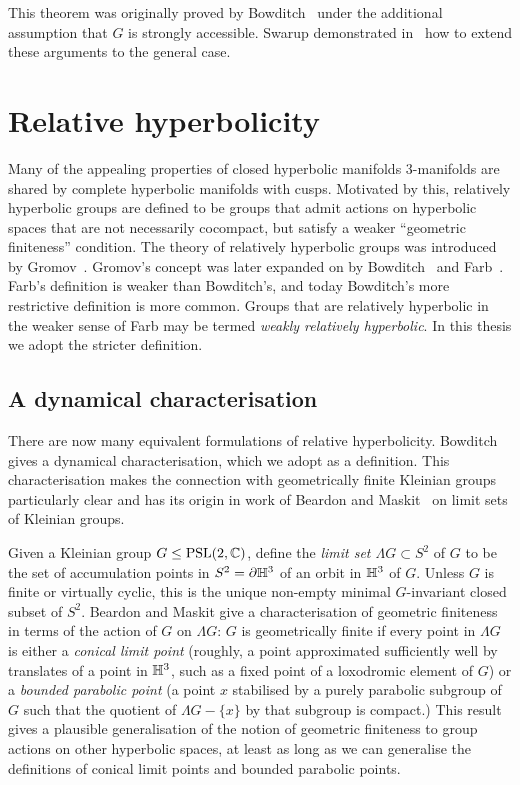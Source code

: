 This theorem was originally proved by Bowditch~\cite{bowditch98b} under the additional assumption that $G$ is strongly accessible.
Swarup demonstrated in~\cite{swarup96} how to extend these arguments to the general case.

\section{Relative hyperbolicity}

Many of the appealing properties of closed hyperbolic manifolds 3-manifolds are shared by complete hyperbolic manifolds with cusps.
Motivated by this, relatively hyperbolic groups are defined to be groups that admit actions on hyperbolic spaces that are not necessarily cocompact, but satisfy a weaker ``geometric finiteness'' condition.
The theory of relatively hyperbolic groups was introduced by Gromov~\cite{gromov87}.
Gromov's concept was later expanded on by Bowditch~\cite{bowditch12} and Farb~\cite{farb98}.
Farb's definition is weaker than Bowditch's, and today Bowditch's more restrictive definition is more common.
Groups that are relatively hyperbolic in the weaker sense of Farb may be termed \emph{weakly relatively hyperbolic}.
In this thesis we adopt the stricter definition.

\subsection{A dynamical characterisation}\label{section:dynamical_characterisation}

There are now many equivalent formulations of relative hyperbolicity.
Bowditch~\cite{bowditch98b} gives a dynamical characterisation, which we adopt as a definition.
This characterisation makes the connection with geometrically finite Kleinian groups particularly clear and has its origin in work of Beardon and Maskit~\cite{beardonmaskit74} on limit sets of Kleinian groups.

Given a Kleinian group $G \leq \mathrm{PSL}(2, \mathbb{C})$, define the \emph{limit set $\Lambda G \subset S^2$} of $G$ to be the set of accumulation points in $S^2 = \partial \mathbb{H}^3$ of an orbit in $\mathbb{H}^3$ of $G$.
Unless $G$ is finite or virtually cyclic, this is the unique non-empty minimal $G$-invariant closed subset of $S^2$.
Beardon and Maskit give a characterisation of geometric finiteness in terms of the action of $G$ on $\Lambda G$: $G$ is geometrically finite if every point in $\Lambda G$ is either a \emph{conical limit point} (roughly, a point approximated sufficiently well by translates of a point in $\mathbb{H}^3$, such as a fixed point of a loxodromic element of $G$) or a \emph{bounded parabolic point} (a point $x$ stabilised by a purely parabolic subgroup of $G$ such that the quotient of $\Lambda G - \{x\}$ by that subgroup is compact.)
This result gives a plausible generalisation of the notion of geometric finiteness to group actions on other hyperbolic spaces, at least as long as we can generalise the definitions of conical limit points and bounded parabolic points.

